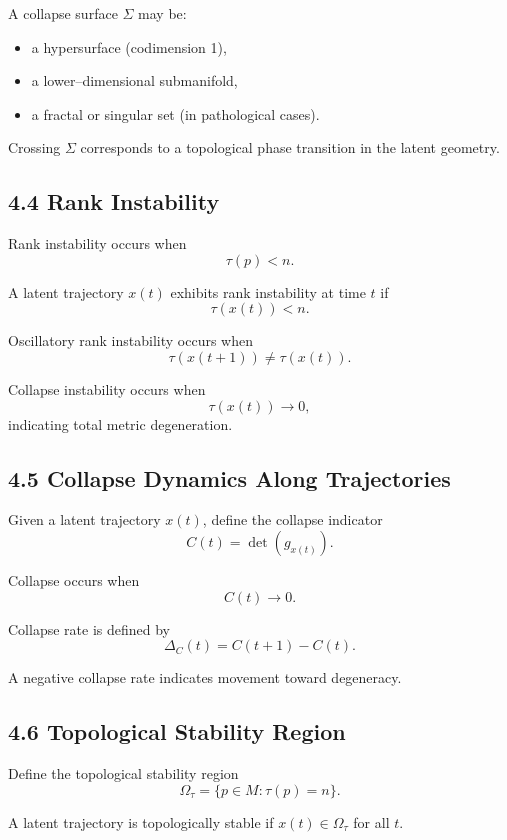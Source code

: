 A collapse surface $\Sigma$ may be:
\begin{itemize}
\item a hypersurface (codimension 1),
\item a lower–dimensional submanifold,
\item a fractal or singular set (in pathological cases).
\end{itemize}

Crossing $\Sigma$ corresponds to a topological phase transition in the
latent geometry.

\subsection*{4.4 Rank Instability}

Rank instability occurs when
\[
\tau(p) < n.
\]

A latent trajectory $x(t)$ exhibits rank instability at time $t$ if
\[
\tau(x(t)) < n.
\]

Oscillatory rank instability occurs when
\[
\tau(x(t+1)) \neq \tau(x(t)).
\]

Collapse instability occurs when
\[
\tau(x(t)) \to 0,
\]
indicating total metric degeneration.

\subsection*{4.5 Collapse Dynamics Along Trajectories}

Given a latent trajectory $x(t)$, define the collapse indicator
\[
C(t) = \det(g_{x(t)}).
\]

Collapse occurs when
\[
C(t) \to 0.
\]

Collapse rate is defined by
\[
\Delta_C(t) = C(t+1) - C(t).
\]

A negative collapse rate indicates movement toward degeneracy.

\subsection*{4.6 Topological Stability Region}

Define the topological stability region
\[
\Omega_{\tau}
= \{ p \in M : \tau(p) = n \}.
\]

A latent trajectory is topologically stable if $x(t) \in \Omega_{\tau}$
for all $t$.

